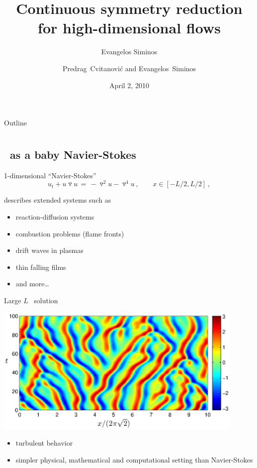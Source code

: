 \documentclass{beamer}
\title{Continuous symmetry reduction for high-dimensional flows}
\author{Evangelos Siminos}
\author[Siminos, Cvitanovi\'c, Davidchack]
{
  \textcolor{green!50!black}{
  {Predrag~Cvitanovi\'c}\inst{1}
  and
  {Evangelos~Siminos}\inst{1,2}
  }
}
\institute
{
  \inst{1}%
  Georgia Institute of Technology
  \and
  \vskip-2mm
  \inst{2}
  CEA/DAM/DIF, Paris
}
\date{April 2, 2010}
\begin{document}
\begin{frame}
  \titlepage
\end{frame}

\begin{frame}{Outline}
  \tableofcontents
\end{frame}


\section[KSe]{\KSe}

\subsection{\KSe\ as a baby Navier-Stokes}
\begin{frame}{\KSe}

\begin{block}{1-dimensional ``Navier-Stokes''}
\[
  u_t + u \triangledown u \,=\, -\triangledown^2 u- \triangledown^4 u
    \,,\qquad   x \in [-L/2,L/2]
    \,,
\]
\end{block}

describes extended systems such as
\begin{itemize}
 \item reaction-diffusion systems
 \item combustion problems (flame fronts)
 \item drift waves in plasmas
 \item thin falling films
 \item and more\ldots
\end{itemize}

\end{frame}

\begin{frame}{Large $L$ \KSe\ solution}

\begin{center}
  \includegraphics[width=0.9\textwidth,height=0.5\textheight,clip=true]{../../figs/ks_largeL_cbar.eps}
\end{center}

\begin{itemize}
\item turbulent behavior
\item simpler physical, mathematical and computational setting than Navier-Stokes
\end{itemize}

\end{frame}
\end{document}
